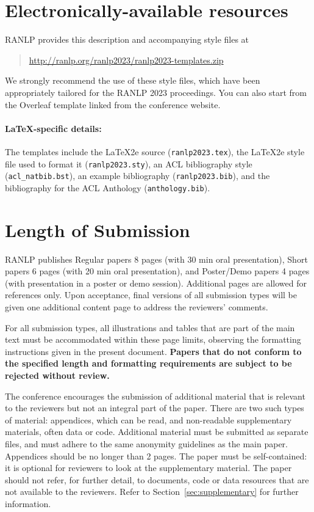 \documentclass[11pt,a4paper]{article}
\begin{document}
\section{Electronically-available resources}

RANLP provides this description and accompanying style files at
\begin{quote}
\url{http://ranlp.org/ranlp2023/ranlp2023-templates.zip}
\end{quote}
We strongly recommend the use of these style files, which have been appropriately tailored for the RANLP 2023 proceedings. You can also start from the Overleaf template linked from the conference website. 

\paragraph{\LaTeX-specific details:}
The templates include the \LaTeX2e{} source (\texttt{\small ranlp2023.tex}),
the \LaTeX2e{} style file used to format it (\texttt{\small ranlp2023.sty}),
an ACL bibliography style (\texttt{\small acl\_natbib.bst}),
an example bibliography (\texttt{\small ranlp2023.bib}),
and the bibliography for the ACL Anthology (\texttt{\small anthology.bib}).


\section{Length of Submission}
\label{sec:length}

RANLP publishes Regular papers 8 pages (with 30 min oral presentation), Short papers 6 pages (with 20 min oral presentation), and Poster/Demo papers 4 pages (with presentation in a poster or demo session). Additional pages are allowed for references only. Upon acceptance, final versions of all submission types will be given one additional content page to address the reviewers' comments.

For all submission types, all illustrations and tables that are part of the main text must be accommodated within these page limits, observing the formatting instructions given in the present document. 
\textbf{Papers that do not conform to the specified length and formatting requirements are subject to be rejected without review.}

The conference encourages the submission of additional material that is relevant to the reviewers but not an integral part of the paper.
There are two such types of material: appendices, which can be read, and non-readable supplementary materials, often data or code. 
Additional material must be submitted as separate files, and must adhere to the same anonymity guidelines as the main paper. Appendices should be no longer than 2 pages.
The paper must be self-contained: it is optional for reviewers to look at the supplementary material.
The paper should not refer, for further detail, to documents, code or data resources that are not available to the reviewers.
Refer to Section~\ref{sec:supplementary} for further information. 
\end{document}
